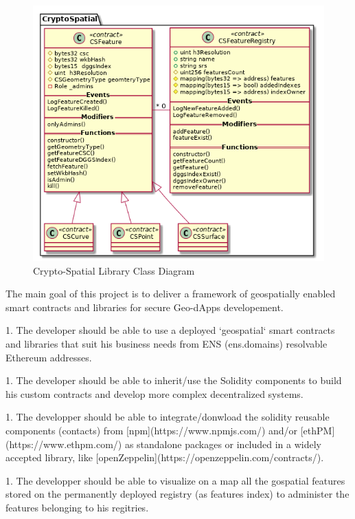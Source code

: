 \documentclass{isprs} %
\begin{document}
\begin{figure}[ht!]
\begin{center}
		\includegraphics[width=1.0\columnwidth]{figures/class-crypto-spatial-lib.png}
	\caption{Crypto-Spatial Library Class Diagram}
\label{fig:figure_placement}
\end{center}
\end{figure}

The main goal of this project is to deliver a framework of geospatially enabled smart contracts and libraries for secure Geo-dApps developement. 

1. The developer should be able to use a deployed `geospatial` smart contracts and libraries that suit his business needs from ENS (ens.domains) resolvable Ethereum addresses.

1. The developer should be able to inherit/use the Solidity components to build his custom contracts and develop more complex decentralized systems. 

1. The developper should be able to integrate/donwload the solidity reusable components (contacts) from [npm](https://www.npmjs.com/) and/or [ethPM](https://www.ethpm.com/) as standalone packages or included in a widely accepted library, like [openZeppelin](https://openzeppelin.com/contracts/).

1. The developper should be able to visualize on a map all the gospatial features stored on the permanently deployed registry (as features index) to administer the features belonging to his regitries.
\end{document}
